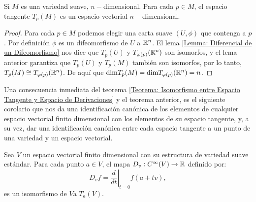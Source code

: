 \begin{theorem}\label{Teorema: Invariancia de la Dimensión}
	Si $M$ es una variedad suave, $n-$dimensional. Para cada $p \in M$, el espacio tangente $T_p(M)$ es un espacio vectorial $n-$dimensional.
\end{theorem}

\begin{proof}
	Para cada $p \in M$ podemos elegir una carta suave $(U, \phi)$ que contenga a
  $p$. Por definición $\phi$ es un difeomorfismo de $U$ a $\mathbb{R}^n$. El lema
  \ref{Lemma: Diferencial de un Difeomorfismo} nos dice que $T_{p}(U)$ y
  $T_{\varphi(p)}(\mathbb{R}^n)$ son isomorfos, y el lema anterior garantiza que $T_{p}(U)$
  y $T_{p}(M)$ también son isomorfos, por lo tanto, $T_{p}(M) \cong T_{\varphi(p)}(\mathbb{R}^n)$. De aquí que $\mathrm{dim} T_p(M) = \mathrm{dim} T_{\varphi(p)}(\mathbb{R}^n) = n$.
\end{proof}

Una consecuencia inmediata del teorema \ref{Teorema: Isomorfismo entre Espacio Tangente y Espacio de Derivaciones} y el teorema anterior, es el siguiente corolario que nos da una identificación canónica de los elementos de cualquier espacio vectorial finito dimensional con los elementos de su espacio tangente, y, a su vez, dar una identificación canónica entre cada espacio tangente a un punto de una variedad y un espacio vectorial.

\begin{corollary}
	Sea $V$ un espacio vectorial finito dimensional con su estructura de variedad suave estándar. Para cada punto $a \in V$, el mapa $D_v: C^{\infty}(V) \to \mathbb{R}$ definido por:
	\[D_vf = \left. \frac{d}{dt} \right|_{t=0} f(a+tv), \]
	es un isomorfismo de $V$a $T_a(V)$.
\end{corollary}
